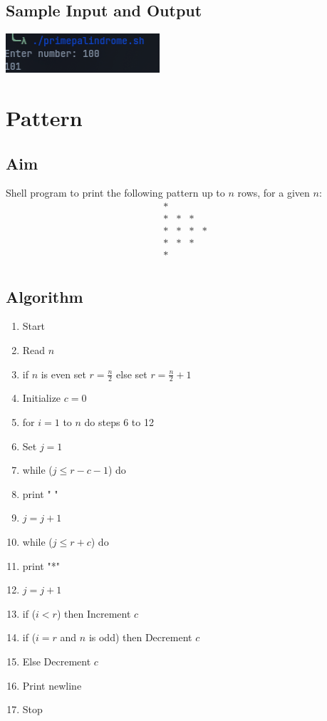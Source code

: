 \subsection{Sample Input and Output}
\includegraphics[]{Cycle_1//Outputs/pandrimicprime.png}

\section{Pattern}
\subsection{Aim}
Shell program to print the following pattern up to \( n \) rows, for a given \( n \):
\[
\begin{array}{cccc}
* & & & \\
* & * & * & \\
* & * & * & * \\
* & * & * & \\
* & & & \\
\end{array}
\]

\subsection{Algorithm}
\begin{enumerate}
    \item Start
    \item Read \( n \)
    \item if \( n \) is even set \( r = \frac{n}{2} \) else set \( r = \frac{n}{2} + 1 \)
    \item Initialize \( c = 0 \)
    \item for \( i = 1 \) to \( n \) do steps 6 to 12
    \item Set \( j = 1 \)
    \item while (\( j \leq r - c - 1 \)) do
    \item print " "
    \item \( j = j + 1 \)
    \item while (\( j \leq r + c \)) do
    \item print "*"
    \item \( j = j + 1 \)
    \item if (\( i < r \)) then Increment \( c \)
    \item if (\( i = r \) and \( n \) is odd) then Decrement \( c \)
    \item Else Decrement \( c \)
    \item Print newline
    \item Stop
\end{enumerate}


